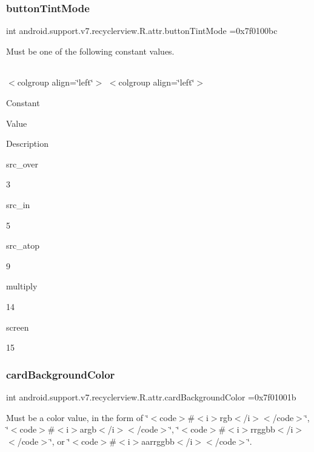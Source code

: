 \subsubsection{\texorpdfstring{button\+Tint\+Mode}{buttonTintMode}}
{\footnotesize\ttfamily int android.\+support.\+v7.\+recyclerview.\+R.\+attr.\+button\+Tint\+Mode =0x7f0100bc\hspace{0.3cm}{\ttfamily [static]}}

Must be one of the following constant values.

\tabulinesep=1mm
\begin{longtabu} spread 0pt [c]{*{0}{|X[-1]}|}
\hline
\end{longtabu}
$<$colgroup align=\char`\"{}left\char`\"{}$>$ $<$colgroup align=\char`\"{}left\char`\"{}$>$ 

Constant

Value

Description 

{\ttfamily src\+\_\+over}

3

{\ttfamily src\+\_\+in}

5

{\ttfamily src\+\_\+atop}

9

{\ttfamily multiply}

14

{\ttfamily screen}

15\mbox{\label{classandroid_1_1support_1_1v7_1_1recyclerview_1_1R_1_1attr_afa0014df296c81eabcf137167588e119}} 
\subsubsection{\texorpdfstring{card\+Background\+Color}{cardBackgroundColor}}
{\footnotesize\ttfamily int android.\+support.\+v7.\+recyclerview.\+R.\+attr.\+card\+Background\+Color =0x7f01001b\hspace{0.3cm}{\ttfamily [static]}}

Must be a color value, in the form of \char`\"{}$<$code$>$\#$<$i$>$rgb$<$/i$>$$<$/code$>$\char`\"{}, \char`\"{}$<$code$>$\#$<$i$>$argb$<$/i$>$$<$/code$>$\char`\"{}, \char`\"{}$<$code$>$\#$<$i$>$rrggbb$<$/i$>$$<$/code$>$\char`\"{}, or \char`\"{}$<$code$>$\#$<$i$>$aarrggbb$<$/i$>$$<$/code$>$\char`\"{}. 

